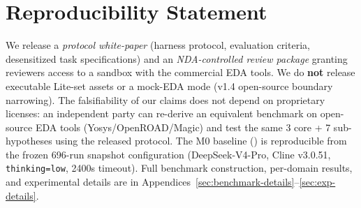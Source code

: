 \section{Reproducibility Statement}
\label{sec:reproducibility}

We release a \emph{protocol white-paper} (harness protocol, evaluation criteria, desensitized task specifications) and an \emph{NDA-controlled review package} granting reviewers access to a sandbox with the commercial EDA tools. We do \textbf{not} release executable Lite-set assets or a mock-EDA mode (v1.4 open-source boundary narrowing). The falsifiability of our claims does not depend on proprietary licenses: an independent party can re-derive an equivalent benchmark on open-source EDA tools (Yosys/OpenROAD/Magic) and test the same 3 core + 7 sub-hypotheses using the released protocol. The M0 baseline (\MzeroPass{}) is reproducible from the frozen 696-run snapshot configuration (DeepSeek-V4-Pro, Cline v3.0.51, \texttt{thinking=low}, 2400s timeout). Full benchmark construction, per-domain results, and experimental details are in Appendices~\ref{sec:benchmark-details}--\ref{sec:exp-details}.
